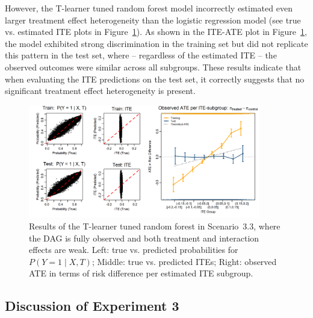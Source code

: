 However, the T-learner tuned random forest model incorrectly estimated even larger treatment effect heterogeneity than the logistic regression model (see true vs. estimated ITE plots in Figure~\ref{fig:small_interaction_tuned_rf_tlearner}). As shown in the ITE-ATE plot in Figure~\ref{fig:small_interaction_tuned_rf_tlearner}, the model exhibited strong discrimination in the training set but did not replicate this pattern in the test set, where -- regardless of the estimated ITE -- the observed outcomes were similar across all subgroups. These results indicate that when evaluating the ITE predictions on the test set, it correctly suggests that no significant treatment effect heterogeneity is present.



\begin{figure}[htbp]
\centering
\includegraphics[width=0.9\textwidth]{img/results_ITE_simulation/small_interaction_tuned_rf_tlearner.png}
\caption{Results of the T-learner tuned random forest in Scenario~3.3, where the DAG is fully observed and both treatment and interaction effects are weak. Left: true vs. predicted probabilities for $P(Y = 1 \mid X, T)$; Middle: true vs. predicted ITEs; Right: observed ATE in terms of risk difference per estimated ITE subgroup.}
\label{fig:small_interaction_tuned_rf_tlearner}
\end{figure}


\FloatBarrier




\subsection{Discussion of Experiment 3} \label{sec:disc_experiment3}




